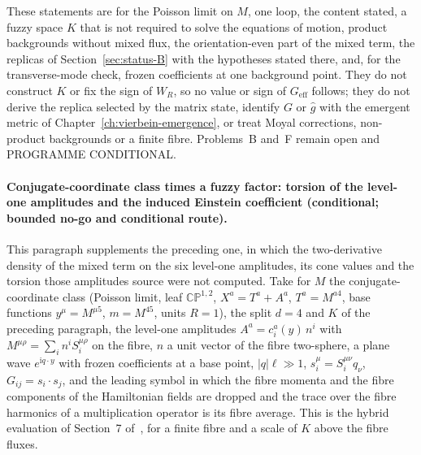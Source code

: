 These statements are for the Poisson limit on \(M\), one loop, the content stated, a fuzzy space \(K\) that is not required to solve the equations of motion, product backgrounds without mixed flux, the orientation-even part of the mixed term, the replicas of Section~\ref{sec:status-B} with the hypotheses stated there, and, for the transverse-mode check, frozen coefficients at one background point. They do not construct \(K\) or fix the sign of \(W_R\), so no value or sign of \(G_{\mathrm{eff}}\) follows; they do not derive the replica selected by the matrix state, identify \(G\) or \(\hat g\) with the emergent metric of Chapter~\ref{ch:vierbein-emergence}, or treat Moyal corrections, non-product backgrounds or a finite fibre. Problems~B and~F remain open and PROGRAMME CONDITIONAL.

\paragraph{Conjugate-coordinate class times a fuzzy factor: torsion of the level-one amplitudes and the induced Einstein coefficient (conditional; bounded no-go and conditional route).}
This paragraph supplements the preceding one, in which the two-derivative density of the mixed term on the six level-one amplitudes, its cone values and the torsion those amplitudes source were not computed. Take for \(M\) the conjugate-coordinate class (Poisson limit, leaf \(\mathbb{CP}^{1,2}\), \(X^a=T^a+A^a\), \(T^a=M^{a4}\), base functions \(y^\mu=M^{\mu5}\), \(m=M^{45}\), units \(R=1\)), the split \(d=4\) and \(K\) of the preceding paragraph, the level-one amplitudes \(A^a=c_i^a(y)\,n^i\) with \(M^{\mu\rho}=\sum_in^iS_i^{\mu\rho}\) on the fibre, \(n\) a unit vector of the fibre two-sphere, a plane wave \(e^{\mathrm iq\cdot y}\) with frozen coefficients at a base point, \(|q|\ell\gg1\), \(s_i^\mu=S_i^{\mu\nu}q_\nu\), \(G_{ij}=s_i\cdot s_j\), and the leading symbol in which the fibre momenta and the fibre components of the Hamiltonian fields are dropped and the trace over the fibre harmonics of a multiplication operator is its fibre average. This is the hybrid evaluation of Section~7 of~\cite{Steinacker2023}, for a finite fibre and a scale of \(K\) above the fibre fluxes.

